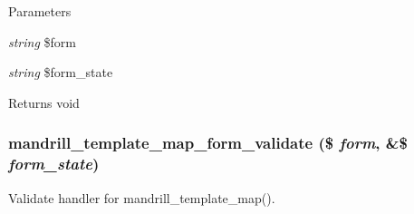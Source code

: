 \begin{DoxyParams}{Parameters}
\item[{\em string}]\$form \item[{\em string}]\$form\_\-state\end{DoxyParams}
\begin{DoxyReturn}{Returns}
void 
\end{DoxyReturn}
\hypertarget{mandrill__template_8admin_8inc_a028364729670c5c1b004ee7008cde808}{
\subsubsection[{mandrill\_\-template\_\-map\_\-form\_\-validate}]{\setlength{\rightskip}{0pt plus 5cm}mandrill\_\-template\_\-map\_\-form\_\-validate (\$ {\em form}, \/  \&\$ {\em form\_\-state})}}
\label{mandrill__template_8admin_8inc_a028364729670c5c1b004ee7008cde808}
Validate handler for mandrill\_\-template\_\-map(). 